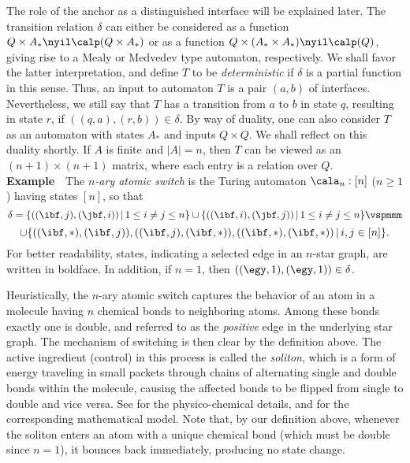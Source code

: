 \documentclass{eptcs}
\begin{document}
The role of the anchor as a distinguished interface will be explained later.
The transition relation $\delta $ can either be considered as a function
$Q\times A_*\nyil \calp (Q\times A_*)$ or as a function $Q\times (A_*\times
A_*)\nyil \calp (Q)$, giving rise to a Mealy or Medvedev type automaton,
respectively. We shall favor the latter interpretation, and define $T$ to be
{\em deterministic\/} if $\delta $ is a partial function in this sense. Thus,
an input to automaton $T$ is a pair $(a,b)$ of interfaces. Nevertheless, we
still say that $T$ has a transition from $a$ to $b$ in state $q$, resulting in
state $r$, if $((q,a),(r,b))\in \delta $. By way of duality, one can also
consider $T$ as an automaton with states $A_*$ and inputs $Q\times Q$. We
shall reflect on this duality shortly. If $A$ is finite and $|A|=n$, then
$T$ can be viewed as an $(n+1)\times (n+1)$ matrix, where each entry is a
relation over $Q$. 
\vspp \newline 
{\bf Example}\ \ The
{\em $n$-ary atomic switch\/} is the Turing automaton $\cala _n:[n]$ ($n\geq 1$) 
having states $[n]$, so that  
\vspmmm
\[ \delta =\{ ((\ibf ,j),(\jbf ,i))\,|\, 1\leq i\neq j\leq n\}\cup 
\{ ((\ibf ,i), (\jbf ,j))\,|\, 1\leq i\neq j\leq n\} \vspmmm \]
\[
\cup
\{((\ibf ,*), (\ibf ,j)), ((\ibf ,j),(\ibf ,*)), ((\ibf ,*),(\ibf ,*))\,|\, i,j\in [n]\}. \]
For better readability, states, indicating a selected edge in an $n$-star graph,
 are written in boldface. In addition, if $n=1$, then
$((\egy , 1),(\egy , 1))\in \delta $. 

  Heuristically, the $n$-ary atomic switch captures the behavior of an atom in a molecule
having $n$ chemical bonds to neighboring atoms. Among these bonds exactly one is double,
and referred to as the {\em positive\/} edge in the underlying star graph. 
The mechanism of switching is then clear by the definition above. The active ingredient
(control) in this process is called the {\em soliton\/}, which is a form of energy traveling
in small packets through chains of alternating single and double bonds within the molecule,
causing the affected bonds to be flipped from single to double and vice versa.
See \cite{dav} for the physico-chemical details, and \cite {das,tcss,det} for the corresponding
mathematical model. Note that, by our definition above, whenever the soliton enters
an atom with a unique chemical bond (which must be double since $n=1$), it bounces
back immediately, producing no state change.
\vspp
 
\end{document}
